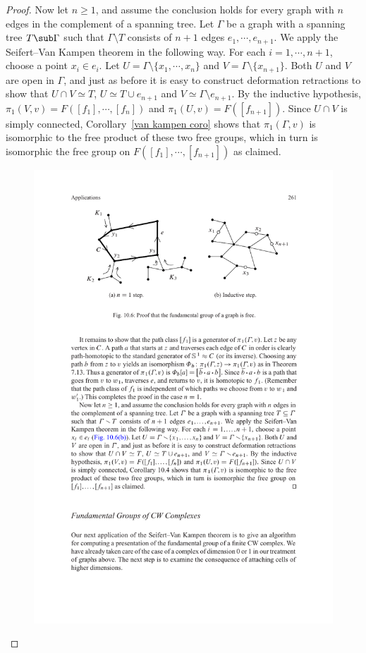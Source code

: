 \begin{proof}
Now let $n\geq1$, and assume the conclusion holds for every graph with $n$ edges in
the complement of a spanning tree. Let $\Gamma$ be a graph with a spanning tree $T\sub\Gamma$ such that $\Gamma\setminus T$ consists of $n+1$ edges $e_1,\cdots,e_{n+1}$. We apply the Seifert–Van Kampen theorem in the following way. For each $i=1,\cdots,n+1$, choose a point $x_i\in e_i$. Let $U=\Gamma\setminus\{x_1,\cdots,x_n\}$ and $V=\Gamma\setminus\{x_{n+1}\}$. Both $U$ and
$V$ are open in $\Gamma$, and just as before it is easy to construct deformation retractions to show that $U\cap V\simeq T$, $U\simeq T\cup e_{n+1}$ and $V\simeq\Gamma\setminus e_{n+1}$. By the inductive hypothesis, $\pi_1(V,v)=F([f_1],\cdots,[f_n])$ and $\pi_1(U,v)=F([f_{n+1}])$. Since $U\cap V$ is simply connected, Corollary~\ref{van kampen coro} shows that $\pi_1(\Gamma,v)$ is isomorphic to the free product of these two free groups, which in turn is isomorphic the free group on $F([f_1],\cdots,[f_{n+1}])$ as claimed.
\begin{figure}[htbp]
\centering
\includegraphics{pictures/fandamental-graph-2}
\end{figure}
\end{proof}
